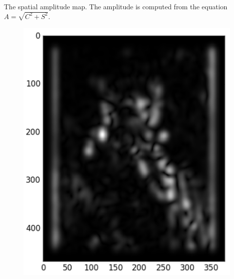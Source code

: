 \documentclass[]{article}
\begin{document}
The spatial amplitude map. The amplitude is computed from the equation $A =
\sqrt{C^{2}+S^{2}}$.
\begin{figure}
    \includegraphics{gabor_output.png}
\end{figure}
\end{document}
